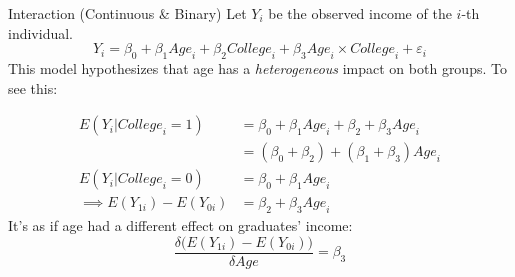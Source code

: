 \documentclass{clbeamer2024}
\begin{document}
\begin{frame}{Interaction (Continuous \& Binary)}
    Let $Y_i$ be the observed income of the $i$-th individual.
    \begin{equation*}
        Y_i = \beta_0 + \beta_1 \textit{Age}_i + \beta_2 \textit{College}_i
            + \beta_3 \textit{Age}_i \times \textit{College}_i + \varepsilon_i
    \end{equation*}
    This model hypothesizes that age has a \textit{heterogeneous} impact on both groups. To see this:
    
    \begin{equation*}
    \begin{split}
        E(Y_i | \textit{College}_i = 1) & = \beta_0 + \beta_1 \textit{Age}_i + \beta_2 + \beta_3 \textit{Age}_i \\
            & = (\beta_0 + \beta_2) + (\beta_1 + \beta_3) \textit{Age}_i \\
        E(Y_i | \textit{College}_i = 0) & = \beta_0 + \beta_1 \textit{Age}_i \\
        \implies E(Y_{1i}) - E(Y_{0i}) & = \beta_2 + \beta_3 \textit{Age}_i
    \end{split}
    \end{equation*}
    It's as if age had a different effect on graduates' income:
    \begin{equation*}
        \frac{\delta \big(E(Y_{1i}) - E(Y_{0i}) \big)}{\delta \textit{Age}} = \beta_3
    \end{equation*}
\end{frame}
\end{document}
